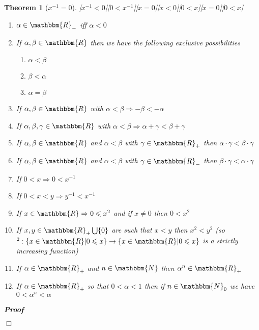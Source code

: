 \documentclass{book}
\newcommand{\um}{-}
\newcommand{\upl}{+}
\newenvironment{proof}{\noindent\textbf{Proof\ }}{\hspace*{\fill}$\Box$\medskip}
\newtheorem{theorem}{Theorem}
\begin{document}
{{\begin{theorem}[$x^{- 1} = 0$][$x^{- 1} < 0$][$0 < x^{- 1}$][$x = 0$][$x <
0$][$0 < x$][$x = 0$][$0 < x$]
\begin{enumerate}
    \item $\alpha \in \mathbbm{R}_-$ iff $\alpha < 0$
    
    \item If $\alpha, \beta \in \mathbbm{R}$ then we have the following
    exclusive possibilities
    \begin{enumerate}
      \item $\alpha < \beta$
      
      \item $\beta < \alpha$
      
      \item $\alpha = \beta$
    \end{enumerate}
    \item If $\alpha, \beta \in \mathbbm{R}$ with $\alpha < \beta \Rightarrow
    - \beta < \um \alpha$
    
    \item If $\alpha, \beta, \gamma \in \mathbbm{R}$ with $\alpha < \beta
    \Rightarrow \alpha \upl \gamma < \beta \upl \gamma$
    
    \item If $\alpha, \beta \in \mathbbm{R}$ and $\alpha < \beta$ with $\gamma
    \in \mathbbm{R}_+$ then $\alpha \cdot \gamma < \beta \cdot \gamma$
    
    \item If $\alpha, \beta \in \mathbbm{R}$ and $\alpha < \beta$ with $\gamma
    \in \mathbbm{R}_-$ then $\beta \cdot \gamma < \alpha \cdot \gamma$
    
    \item If $0 < x \Rightarrow 0 < x^{- 1}$
    
    \item If $0 < x < y \Rightarrow y^{- 1} < x^{- 1}$
    
    \item If $x \in \mathbbm{R} \Rightarrow 0 \leqslant x^2$ and if $x \neq 0$
    then $0 < x^2$
    
    \item If $x, y \in \mathbbm{R}_+ \bigcup \{ 0 \}$ are such that $x < y$
    then $x^2 < y^2$ (so $^2 : \{ x \in \mathbbm{R}|0 \leqslant x \}
    \rightarrow \{ x \in \mathbbm{R}|0 \leqslant x \}$ is a strictly
    increasing function)
    
    \item If $\alpha \in \mathbbm{R}_+$ and $n \in \mathbbm{N}$ then $\alpha^n
    \in \mathbbm{R}_+$
    
    \item If $\alpha \in \mathbbm{R}_+$ so that $0 < \alpha < 1$ then if $n
    \in \mathbbm{N}_0$ we have $0 < \alpha^n < \alpha$
  \end{enumerate}
  \begin{proof}
    

\end{proof}
\end{theorem}}}
\end{document}
